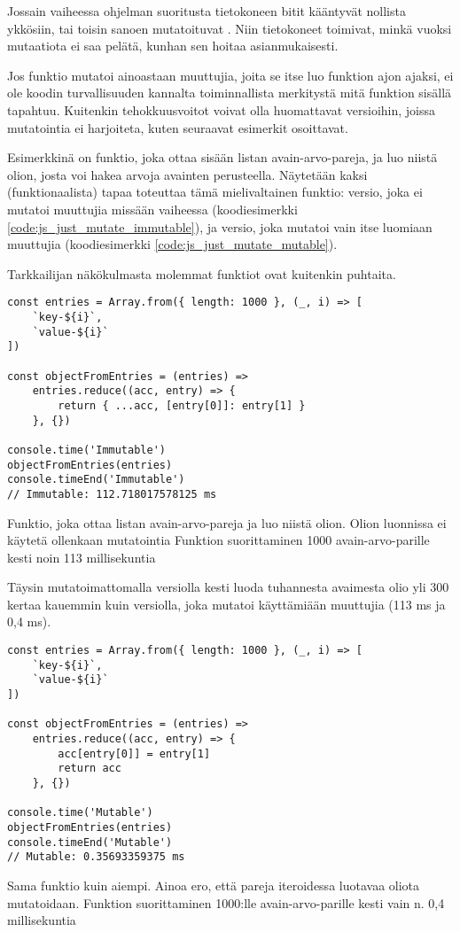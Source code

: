 Jossain vaiheessa ohjelman suoritusta tietokoneen bitit kääntyvät nollista ykkösiin, tai toisin sanoen mutatoituvat \cite{is_reduce_bad}. Niin tietokoneet toimivat, minkä vuoksi mutaatiota ei saa pelätä, kunhan sen hoitaa asianmukaisesti.

Jos funktio mutatoi ainoastaan muuttujia, joita se itse luo funktion ajon ajaksi, ei ole koodin turvallisuuden kannalta toiminnallista merkitystä mitä funktion sisällä tapahtuu. Kuitenkin tehokkuusvoitot voivat olla huomattavat versioihin, joissa mutatointia ei harjoiteta, kuten seuraavat esimerkit osoittavat.

Esimerkkinä on funktio, joka ottaa sisään listan avain-arvo-pareja, ja luo niistä olion, josta voi hakea arvoja avainten perusteella. Näytetään kaksi (funktionaalista) tapaa toteuttaa tämä mielivaltainen funktio:
versio, joka ei mutatoi muuttujia missään vaiheessa (koodiesimerkki \ref{code:js_just_mutate_immutable}), ja versio, joka mutatoi vain itse luomiaan muuttujia (koodiesimerkki \ref{code:js_just_mutate_mutable}).

Tarkkailijan näkökulmasta molemmat funktiot ovat kuitenkin puhtaita.

\begin{code}
    \begin{verbatim}
const entries = Array.from({ length: 1000 }, (_, i) => [
    `key-${i}`,
    `value-${i}`
])

const objectFromEntries = (entries) =>
    entries.reduce((acc, entry) => {
        return { ...acc, [entry[0]]: entry[1] }
    }, {})

console.time('Immutable')
objectFromEntries(entries)
console.timeEnd('Immutable')
// Immutable: 112.718017578125 ms
\end{verbatim}
    \caption{Funktio, joka ottaa listan avain-arvo-pareja ja luo niistä olion. Olion luonnissa ei käytetä ollenkaan mutatointia Funktion suorittaminen 1000 avain-arvo-parille kesti noin 113 millisekuntia}
    \label{code:js_just_mutate_immutable}
\end{code}

Täysin mutatoimattomalla versiolla kesti luoda tuhannesta avaimesta olio yli 300 kertaa kauemmin kuin versiolla, joka mutatoi käyttämiään muuttujia (113 ms ja 0,4 ms).


\begin{code}
    \begin{verbatim}
const entries = Array.from({ length: 1000 }, (_, i) => [
    `key-${i}`,
    `value-${i}`
])

const objectFromEntries = (entries) =>
    entries.reduce((acc, entry) => {
        acc[entry[0]] = entry[1]
        return acc
    }, {})
          
console.time('Mutable')
objectFromEntries(entries)
console.timeEnd('Mutable')
// Mutable: 0.35693359375 ms
\end{verbatim}
    \caption{Sama funktio kuin aiempi. Ainoa ero, että pareja iteroidessa luotavaa oliota mutatoidaan. Funktion suorittaminen 1000:lle avain-arvo-parille kesti vain n. 0,4 millisekuntia}
    \label{code:js_just_mutate_mutable}
\end{code}

